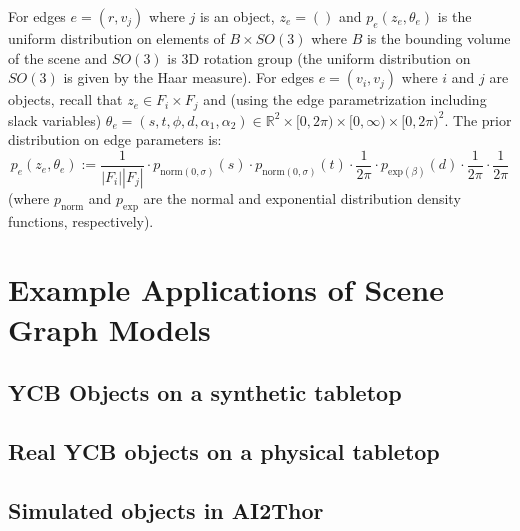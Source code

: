 For edges $e = (r, v_j)$ where $j$ is an object, $z_e = ()$ and $p_e(z_e, \theta_e)$ is the uniform distribution on elements of $B \times SO(3)$ where $B$ is the bounding volume of the scene and $SO(3)$ is 3D rotation group (the uniform distribution on $SO(3)$ is given by the Haar measure).
For edges $e = (v_i, v_j)$ where $i$ and $j$ are objects, recall that $z_e \in F_i \times F_j$ and (using the edge parametrization including slack variables) $\theta_e = (s, t, \phi, d, \alpha_1, \alpha_2) \in \mathbb{R}^2 \times [0, 2 \pi) \times [0, \infty) \times [0, 2 \pi)^2$.
The prior distribution on edge parameters is:
\begin{equation}
    p_e(z_e, \theta_e) := \frac{1}{|F_i| |F_j|}
    \cdot p_{\mathrm{norm}(0, \sigma)}(s) \cdot p_{\mathrm{norm}(0, \sigma)}(t)
    \cdot \frac{1}{2 \pi}
    \cdot p_{\mathrm{exp}(\beta)}(d)
    \cdot \frac{1}{2 \pi}
    \cdot \frac{1}{2 \pi}
\end{equation}
(where $p_{\mathrm{norm}}$ and $p_{\mathrm{exp}}$ are the normal and exponential distribution density functions, respectively).

\section{Example Applications of Scene Graph Models}

\todo

\subsection{YCB Objects on a synthetic tabletop}

\todo

\subsection{Real YCB objects on a physical tabletop}

\todo

\subsection{Simulated objects in AI2Thor}

\todo
